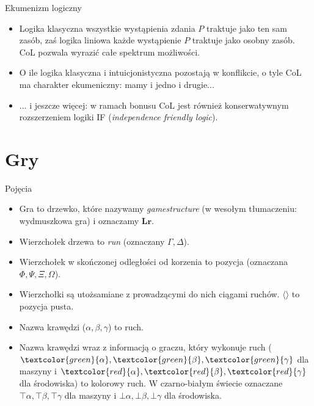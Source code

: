 \documentclass{beamer}
\begin{document}
\begin{frame}{Ekumenizm logiczny}
\begin{itemize}
	\item Logika klasyczna wszystkie wystąpienia zdania $P$ traktuje jako ten sam zasób, zaś logika liniowa każde wystąpienie $P$ traktuje jako osobny zasób. CoL pozwala wyrazić całe spektrum możliwości.
	\item O ile logika klasyczna i intuicjonistyczna pozostają w konflikcie, o tyle CoL ma charakter ekumeniczny: mamy i jedno i drugie...
	\item ... i jeszcze więcej: w ramach bonusu CoL jest również konserwatywnym rozszerzeniem logiki IF (\textit{independence friendly logic}).
\end{itemize}
\end{frame}


\section{Gry}

\begin{frame}{Pojęcia}
\begin{itemize}
	\item Gra to drzewko, które nazywamy \textit{gamestructure} (w wesołym tłumaczeniu: wydmuszkowa gra) i oznaczamy $\textbf{Lr}$.
	\item Wierzchołek drzewa to \textit{run} (oznaczany $\Gamma, \Delta$).
	\item Wierzchołek w skończonej odległości od korzenia to pozycja (oznaczana $\Phi, \Psi, \Xi, \Omega$).
	\item Wierzchołki są utożsamiane z prowadzącymi do nich ciągami ruchów. $\langle\rangle$ to pozycja pusta.
	\item Nazwa krawędzi ($\alpha, \beta, \gamma$) to ruch.
	\item Nazwa krawędzi wraz z informacją o graczu, który wykonuje ruch ($\textcolor{green}{\alpha}, \textcolor{green}{\beta}, \textcolor{green}{\gamma}$ dla maszyny i $\textcolor{red}{\alpha}, \textcolor{red}{\beta}, \textcolor{red}{\gamma}$ dla środowiska) to kolorowy ruch. W czarno-białym świecie oznaczane $\top\alpha, \top\beta, \top\gamma$ dla maszyny i $\bot\alpha, \bot\beta, \bot\gamma$ dla środowiska.
\end{itemize}
\end{frame}
\end{document}
